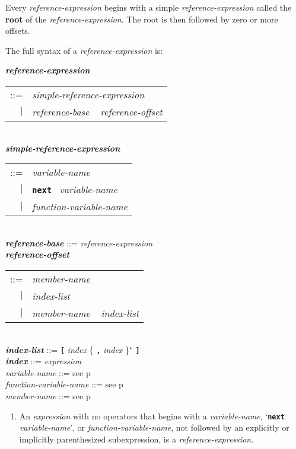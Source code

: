 \documentclass[12pt]{article}
\newcommand{\TT}[1]{{\tt \bfseries #1}}
\newcommand{\STAR}{{\Large $^\star$}}
\newcommand{\key}[1]{{\rm \bfseries #1}}
\newcommand{\emkey}[1]{{\em \bfseries #1}}
\newcommand{\pagref}[1]{p\pageref{#1}}
\newenvironment{indpar}[1][0.3in]%
	{\begin{list}{}%
		     {\setlength{\itemsep}{0in}%
		      \setlength{\topsep}{0in}%
		      \setlength{\parsep}{1ex}%
		      \setlength{\labelwidth}{#1}%
		      \setlength{\leftmargin}{#1}%
		      \addtolength{\leftmargin}{\labelsep}}%
	 \item}%
	{\end{list}}
\begin{document}
Every {\em reference-expression} begins with a simple
{\em reference-expression} called the \key{root} of the
{\em reference-expression}.  The root is then followed by zero or more
offsets.

The full syntax of a {\em reference-expression} is:

\begin{indpar}
\emkey{reference-expression}\label{REFERENCE-EXPRESSION}
    \begin{tabular}[t]{rl}
    ::= & {\em simple-reference-expression} \\
    $|$ & {\em reference-base} ~ {\em reference-offset} \\
    \end{tabular}
\\[0.5ex]
\emkey{simple-reference-expression}\label{SIMPLE-REFERENCE-EXPRESSION}
    \begin{tabular}[t]{rl}
    ::= & {\em variable-name} \\
    $|$ & \TT{next}~ {\em variable-name} \\
    $|$ & {\em function-variable-name} \\
    \end{tabular}
\\[0.5ex]
\emkey{reference-base}\label{REFERENCE-BASE}
    ::= {\em reference-expression}
\\[0.5ex]
\emkey{reference-offset}\label{REFERENCE-OFFSET}
    \begin{tabular}[t]{rl}
    ::= & {\em member-name} \\
    $|$ & {\em index-list} \\
    $|$ & {\em member-name} ~ {\em index-list} \\
    \end{tabular}
\\[0.5ex]
\emkey{index-list} ::= \TT{[} {\em index} \{ \TT{,} {\em index} \}\STAR{} \TT{]}
\\[0.5ex]
\emkey{index}\label{REFERENCE-INDEX}
    ::= {\em expression}
\\[0.5ex]
{\em variable-name} ::= see \pagref{VARIABLE-NAME}
\\[0.5ex]
{\em function-variable-name} ::= see \pagref{FUNCTION-VARIABLE-NAME}
\\[0.5ex]
{\em member-name} ::= see \pagref{MEMBER-NAME}
\begin{enumerate}
\item
An {\em expression} with no operators that begins
with a {\em variable-name}, `\TT{next} {\em vari\-able-name}',
or {\em function-variable-name},
not followed
by an explicitly or implicitly parenthesized subexpression,
is a {\em reference-expression}.


\end{enumerate}
\end{indpar}
\end{document}
